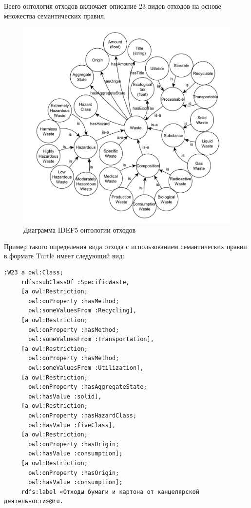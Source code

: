 \documentclass[a4paper]{G2-105}
\begin{document}
Всего онтология отходов  включает описание 23 видов отходов на основе множества семантических правил.

\begin{figure}[H]
\centering
\includegraphics[scale=0.6]{waste_ontology}
\caption{Диаграмма IDEF5 онтологии отходов}
\label{fig:waste_ontology}
\end{figure}

Пример такого определения вида отхода с использованием семантических правил в формате Turtle имеет следующий вид:
\begin{verbatim}
:W23 a owl:Class;
     rdfs:subClassOf :SpecificWaste,
     [a owl:Restriction;
       owl:onProperty :hasMethod;
       owl:someValuesFrom :Recycling],
     [a owl:Restriction;
       owl:onProperty :hasMethod;
       owl:someValuesFrom :Transportation],
     [a owl:Restriction;
       owl:onProperty :hasMethod;
       owl:someValuesFrom :Utilization],
     [a owl:Restriction;
       owl:onProperty :hasAggregateState;
       owl:hasValue :solid],
     [a owl:Restriction;
       owl:onProperty :hasHazardClass;
       owl:hasValue :fiveClass],
     [a owl:Restriction;
       owl:onProperty :hasOrigin;
       owl:hasValue :consumption];
     [a owl:Restriction;
       owl:onProperty :hasOrigin;
       owl:hasValue :consumption];
     rdfs:label «Отходы бумаги и картона от канцелярской деятельности»@ru.
\end{verbatim}
\end{document}

